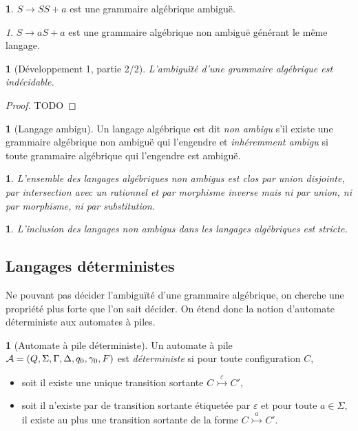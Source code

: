 \documentclass[10pt,a4paper,notitlepage]{article}
\theoremstyle{plain}
\theoremstyle{definition}
\newtheorem{defn}[thm]{\protect\definitionname}
\theoremstyle{definition}
\newtheorem{example}[thm]{\protect\examplename}
\theoremstyle{remark}
\theoremstyle{remark}
\newtheorem{rem}[thm]{\protect\remarkname}
\theoremstyle{plain}
\theoremstyle{plain}
\newtheorem{prop}[thm]{\protect\propositionname}
\theoremstyle{plain}
\theoremstyle{remark}
\providecommand{\definitionname}{Définition}
\providecommand{\examplename}{Exemple}
\providecommand{\propositionname}{Proposition}
\providecommand{\remarkname}{Remarque}
\begin{document}
\begin{example}
	$S\to SS+a$ est une grammaire algébrique ambiguë.
\end{example}

\begin{rem}
	$S\to aS+a$ est une grammaire algébrique non ambiguë générant le même langage.
\end{rem}

\begin{prop}[Développement 1, partie 2/2]
	L'ambiguïté d'une grammaire algébrique est indécidable.
\end{prop}

\begin{proof}
	TODO
\end{proof}

\begin{defn}[Langage ambigu] %
	Un langage algébrique est dit \emph{non ambigu} s'il existe une grammaire algébrique non ambiguë qui l'engendre et \emph{inhéremment ambigu} si toute grammaire algébrique qui l'engendre est ambiguë.
\end{defn}

\begin{prop}
	L'ensemble des langages algébriques non ambigus est clos par union disjointe, par intersection avec un rationnel et par morphisme inverse mais ni par union, ni par morphisme, ni par substitution. %
\end{prop}

\begin{prop} %
	L'inclusion des langages non ambigus dans les langages algébriques est stricte.
\end{prop}

\subsection{Langages déterministes} %

Ne pouvant pas décider l'ambiguïté d'une grammaire algébrique, on cherche une propriété plus forte que l'on sait décider. On étend donc la notion d'automate déterministe aux automates à piles.

\begin{defn}[Automate à pile déterministe]
	Un automate à pile \\$\mathcal{A}=(Q,\Sigma, \Gamma, \Delta, q_0, \gamma_0, F)$ est \emph{déterministe} si pour toute configuration $C$,
	\begin{itemize}
		\item soit il existe une unique transition sortante $C\overset{\varepsilon}{\rightarrowtail}C'$,
		\item soit il n'existe par de transition sortante étiquetée par $\varepsilon$ et pour toute $a\in \Sigma$, il existe au plus une transition sortante de la forme $C\overset{a}{\rightarrowtail}C'$.
	\end{itemize}
\end{defn}
\end{document}
